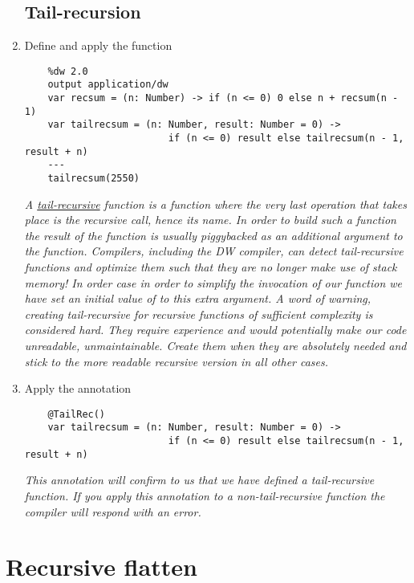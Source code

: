 \begin{enumerate}[resume*]
\subsection{Tail-recursion}

\item Define and apply the  function
  \begin{lstlisting}
    %dw 2.0
    output application/dw
    var recsum = (n: Number) -> if (n <= 0) 0 else n + recsum(n - 1)
    var tailrecsum = (n: Number, result: Number = 0) -> 
                         if (n <= 0) result else tailrecsum(n - 1, result + n)
    ---
    tailrecsum(2550)
  \end{lstlisting}
  \emph{
    A \href{https://en.wikipedia.org/wiki/Tail_call}{tail-recursive} function is a function where the very last operation that takes place is the recursive call, hence its name.  In order to build such a function the result of the function is usually piggybacked as an additional argument to the function. Compilers, including the DW compiler, can detect tail-recursive functions and optimize them such that they are no longer make use of stack memory!
    \newline
    In order case in order to simplify the invocation of our function we have set an initial value of  to this extra argument.
    \newline
    A word of warning, creating tail-recursive for recursive functions of sufficient complexity is considered hard.  They require experience and would potentially make our code unreadable, unmaintainable.  Create them when they are absolutely needed and stick to the more readable recursive version in all other cases.  
  }
\item Apply the  annotation
  \begin{lstlisting}
    @TailRec()
    var tailrecsum = (n: Number, result: Number = 0) -> 
                         if (n <= 0) result else tailrecsum(n - 1, result + n)
  \end{lstlisting}
  \emph{
    This annotation will confirm to us that we have defined a tail-recursive function.  If you apply this annotation to a non-tail-recursive function the compiler will respond with an error.
  }
\end{enumerate}


\section{Recursive flatten}


